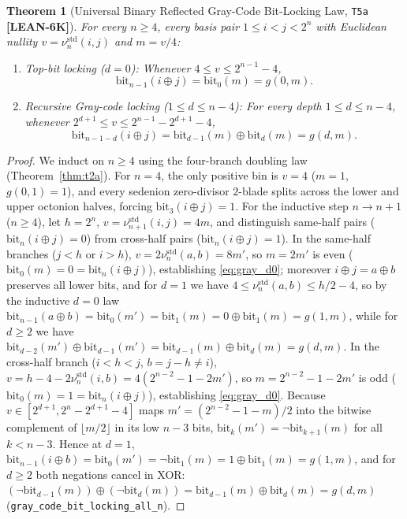 \documentclass[11pt,reqno]{amsart}
\newcommand{\code}[1]{\textnormal{\texttt{\small\nolinkurl{#1}}}}
\theoremstyle{plain}
\newtheorem{theorem}{Theorem}[section]
\theoremstyle{definition}
\theoremstyle{remark}
\newcommand{\tagLean}{\mbox{\textsf{\textbf{\color{oiBlue}[LEAN-6K]}}}}
\newcommand{\std}{\mathrm{std}}
\begin{document}
\begin{theorem}[Universal Binary Reflected Gray-Code Bit-Locking Law, \texttt{T5a} \tagLean]
\label{thm:t5a}
For every $n \ge 4$, every basis pair $1 \le i < j < 2^n$ with Euclidean nullity
$v = \nu_n^{\std}(i, j)$ and $m = v / 4$:
\begin{enumerate}[leftmargin=2em]
  \item \emph{Top-bit locking ($d = 0$):} Whenever $4 \le v \le 2^{n-1} - 4$,
    \begin{equation}
    \label{eq:gray_d0}
      \mathrm{bit}_{n-1}(i \oplus j) = \mathrm{bit}_0(m) = g(0, m).
    \end{equation}
  \item \emph{Recursive Gray-code locking ($1 \le d \le n - 4$):} For every depth
    $1 \le d \le n - 4$, whenever $2^{d+1} \le v \le 2^{n-1} - 2^{d+1} - 4$,
    \begin{equation}
    \label{eq:gray_dge1}
      \mathrm{bit}_{n-1-d}(i \oplus j) = \mathrm{bit}_{d-1}(m) \oplus \mathrm{bit}_d(m) = g(d, m).
    \end{equation}
\end{enumerate}
\end{theorem}

\begin{proof}
We induct on $n \ge 4$ using the four-branch doubling law (Theorem~\ref{thm:t2a}). For $n = 4$,
the only positive bin is $v = 4$ ($m = 1$, $g(0, 1) = 1$), and every sedenion zero-divisor
$2$-blade splits across the lower and upper octonion halves, forcing $\mathrm{bit}_3(i \oplus j) = 1$.
For the inductive step $n \to n + 1$ ($n \ge 4$), let $h = 2^n$, $v = \nu_{n+1}^{\std}(i, j) = 4m$,
and distinguish same-half pairs ($\mathrm{bit}_n(i \oplus j) = 0$) from cross-half pairs
($\mathrm{bit}_n(i \oplus j) = 1$).
In the same-half branches ($j < h$ or $i > h$), $v = 2\nu_n^{\std}(a, b) = 8m'$, so $m = 2m'$ is
even ($\mathrm{bit}_0(m) = 0 = \mathrm{bit}_n(i \oplus j)$), establishing \eqref{eq:gray_d0};
moreover $i \oplus j = a \oplus b$ preserves all lower bits, and for $d = 1$ we have
$4 \le \nu_n^{\std}(a, b) \le h/2 - 4$, so by the inductive $d = 0$ law
$\mathrm{bit}_{n-1}(a \oplus b) = \mathrm{bit}_0(m') = \mathrm{bit}_1(m) = 0 \oplus \mathrm{bit}_1(m) = g(1, m)$,
while for $d \ge 2$ we have $\mathrm{bit}_{d-2}(m') \oplus \mathrm{bit}_{d-1}(m') = \mathrm{bit}_{d-1}(m) \oplus \mathrm{bit}_d(m) = g(d, m)$.
In the cross-half branch ($i < h < j$, $b = j - h \neq i$), $v = h - 4 - 2\nu_n^{\std}(i, b) = 4(2^{n-2} - 1 - 2m')$,
so $m = 2^{n-2} - 1 - 2m'$ is odd ($\mathrm{bit}_0(m) = 1 = \mathrm{bit}_n(i \oplus j)$),
establishing \eqref{eq:gray_d0}. Because $v \in [2^{d+1}, 2^n - 2^{d+1} - 4]$ maps
$m' = (2^{n-2} - 1 - m)/2$ into the bitwise complement of $\lfloor m / 2 \rfloor$ in its low
$n - 3$ bits, $\mathrm{bit}_k(m') = \neg\mathrm{bit}_{k+1}(m)$ for all $k < n - 3$. Hence at
$d = 1$, $\mathrm{bit}_{n-1}(i \oplus b) = \mathrm{bit}_0(m') = \neg\mathrm{bit}_1(m) = 1 \oplus \mathrm{bit}_1(m) = g(1, m)$,
and for $d \ge 2$ both negations cancel in XOR:
$(\neg\mathrm{bit}_{d-1}(m)) \oplus (\neg\mathrm{bit}_d(m)) = \mathrm{bit}_{d-1}(m) \oplus \mathrm{bit}_d(m) = g(d, m)$
(\code{gray_code_bit_locking_all_n}).
\end{proof}
\end{document}
